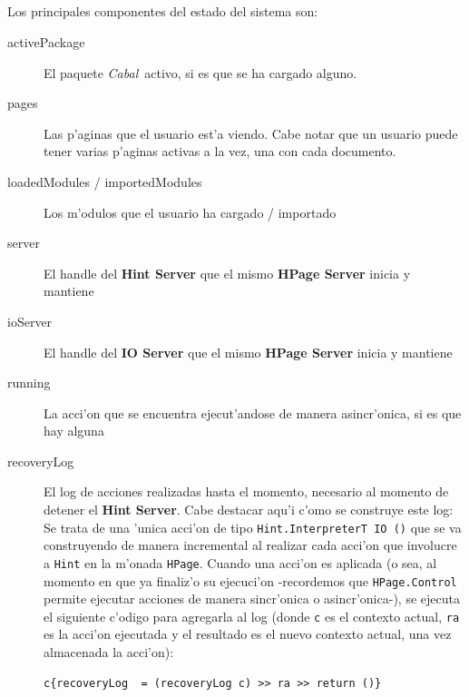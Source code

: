 \documentclass[a4paper]{article}
\newcommand{\cabal}{\textsl{Cabal}}
\begin{document}
\subparagraph{} Los principales componentes del estado del sistema son:
\begin{description}
	\item[activePackage] El paquete \cabal\ activo, si es que se ha cargado alguno.
	\item[pages] Las p'aginas que el usuario est'a viendo.  Cabe notar que un usuario puede tener varias p'aginas activas a la vez, una con cada documento.
	\item[loadedModules / importedModules] Los m'odulos que el usuario ha cargado / importado
	\item[server] El handle del \textbf{Hint Server} que el mismo \textbf{HPage Server} inicia y mantiene
	\item[ioServer] El handle del \textbf{IO Server} que el mismo \textbf{HPage Server} inicia y mantiene
	\item[running] La acci'on que se encuentra ejecut'andose de manera asincr'onica, si es que hay alguna
	\item[recoveryLog] El log de acciones realizadas hasta el momento, necesario al momento de detener el \textbf{Hint Server}.  Cabe destacar aqu'i c'omo se construye este log: Se trata de una 'unica acci'on de tipo \texttt{Hint.InterpreterT IO ()} que se va construyendo de manera incremental al realizar cada acci'on que involucre a \texttt{Hint} en la m'onada \texttt{HPage}.  Cuando una acci'on es aplicada (o sea, al momento en que ya finaliz'o su ejecuci'on -recordemos que \texttt{HPage.Control} permite ejecutar acciones de manera sincr'onica o asincr'onica-), se ejecuta el siguiente c'odigo para agregarla al log (donde \texttt{c} es el contexto actual, \texttt{ra} es la acci'on ejecutada y el resultado es el nuevo contexto actual, una vez almacenada la acci'on):
\begin{center}\begin{lstlisting}
c{recoveryLog  = (recoveryLog c) >> ra >> return ()}
\end{lstlisting}\end{center}
\end{description}
\end{document}
